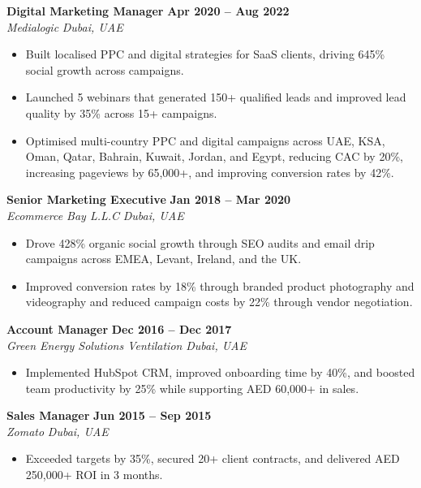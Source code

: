 \documentclass[10.5pt,a4paper]{article}
\begin{document}
\noindent\textbf{Digital Marketing Manager} \hfill \textbf{Apr 2020 -- Aug 2022}\\
\textit{Medialogic} \hfill \textit{Dubai, UAE}
\begin{itemize}[leftmargin=*,nosep,topsep=2pt]
  \item Built localised PPC and digital strategies for SaaS clients, driving 645\% social growth across campaigns.
  \item Launched 5 webinars that generated 150+ qualified leads and improved lead quality by 35\% across 15+ campaigns.
  \item Optimised multi-country PPC and digital campaigns across UAE, KSA, Oman, Qatar, Bahrain, Kuwait, Jordan, and Egypt, reducing CAC by 20\%, increasing pageviews by 65,000+, and improving conversion rates by 42\%.
\end{itemize}
\vspace{4pt}

\noindent\textbf{Senior Marketing Executive} \hfill \textbf{Jan 2018 -- Mar 2020}\\
\textit{Ecommerce Bay L.L.C} \hfill \textit{Dubai, UAE}
\begin{itemize}[leftmargin=*,nosep,topsep=2pt]
  \item Drove 428\% organic social growth through SEO audits and email drip campaigns across EMEA, Levant, Ireland, and the UK.
  \item Improved conversion rates by 18\% through branded product photography and videography and reduced campaign costs by 22\% through vendor negotiation.
\end{itemize}
\vspace{4pt}

\noindent\textbf{Account Manager} \hfill \textbf{Dec 2016 -- Dec 2017}\\
\textit{Green Energy Solutions Ventilation} \hfill \textit{Dubai, UAE}
\begin{itemize}[leftmargin=*,nosep,topsep=2pt]
  \item Implemented HubSpot CRM, improved onboarding time by 40\%, and boosted team productivity by 25\% while supporting AED 60,000+ in sales.
\end{itemize}
\vspace{4pt}

\noindent\textbf{Sales Manager} \hfill \textbf{Jun 2015 -- Sep 2015}\\
\textit{Zomato} \hfill \textit{Dubai, UAE}
\begin{itemize}[leftmargin=*,nosep,topsep=2pt]
  \item Exceeded targets by 35\%, secured 20+ client contracts, and delivered AED 250,000+ ROI in 3 months.
\end{itemize}
\vspace{4pt}
\end{document}
